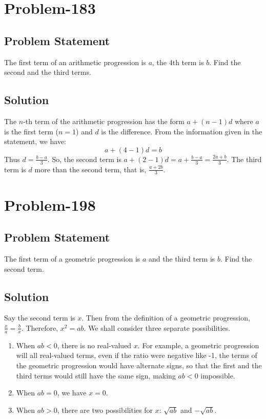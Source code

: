 \documentclass[12pt]{article}
\begin{document}
\section*{Problem-183}
\subsection*{Problem Statement}
The first term of an arithmetic progression is $a$, the 4th term is $b$. Find the second and the third terms.
\subsection*{Solution}
The $n$-th term of the arithmetic progression has the form $a+(n-1)d$ where $a$ is the first term ($n=1$) and $d$ is the difference. From the information given in the statement, we have:
\[
a + (4-1)d = b
\]
Thus $d = \frac{b-a}{3}$. So, the second term is $a+(2-1)d = a+\frac{b-a}{3} = \frac{2a+b}{3}$. The third term is $d$ more than the second term, that is, $\frac{a+2b}{3}$.

\section*{Problem-198}
\subsection*{Problem Statement}
The first term of a geometric progression is $a$ and the third term is $b$. Find the second term.
\subsection*{Solution}
Say the second term is $x$. Then from the definition of a geometric progression, $\frac{x}{a} = \frac{b}{x}$. Therefore, $x^2 = ab$. We shall consider three separate possibilities.
\begin{enumerate}
\item When $ab < 0$, there is no real-valued $x$. For example, a geometric progression will all real-valued terms, even if the ratio were negative like -1, the terms of the geometric progression would have alternate signs, so that the first and the third terms would still have the same sign, making $ab < 0$ impossible.
\item When $ab = 0$, we have $x = 0$.
\item When $ab > 0$, there are two possibilities for $x$: $\sqrt{ab}$ and $-\sqrt{ab}$. 
\end{enumerate}
\end{document}
